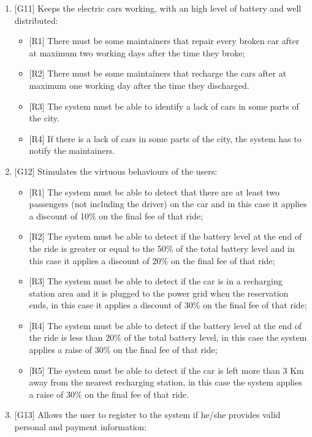 \begin{enumerate}
\item {[G11]} Keeps the electric cars working, with an high level of battery and well distributed:

\begin{itemize}
	\item {[R1]} There must be some maintainers that repair every broken car after at maximum two working days after the time they broke;
	\item {[R2]} There must be some maintainers that recharge the cars after at maximum one working day after the time they discharged.
	\item {[R3]} The system must be able to identify a lack of cars in some parts of the city.
	\item {[R4]} If there is a lack of cars in some parts of the city, the system has to notify the maintainers.
\end{itemize}

\item {[G12]} Stimulates the virtuous behaviours of the users:

\begin{itemize}
	\item {[R1]} The system must be able to detect that there are at least two passengers (not including the driver) on the car and in this case it applies a discount of 10\% on the final fee of that ride;
	\item {[R2]} The system must be able to detect if the battery level at the end of the ride is greater or equal to the 50\% of the total battery level and in this case it applies a discount of 20\% on the final fee of that ride;
	\item {[R3]} The system must be able to detect if the car is in a recharging station area and it is plugged to the power grid when the reservation ends, in this case it applies a discount of 30\% on the final fee of that ride;
	\item {[R4]} The system must be able to detect if the battery level at the end of the ride is less than 20\% of the total battery level, in this case the system applies a raise of 30\% on the final fee of that ride;
	\item {[R5]} The system must be able to detect if the car is left more than 3 Km away from the nearest recharging station, in this case the system applies a raise of 30\% on the final fee of that ride.
\end{itemize}

\item {[G13]} Allows the user to register to the system if he/she provides valid personal and payment information:


\end{enumerate}
